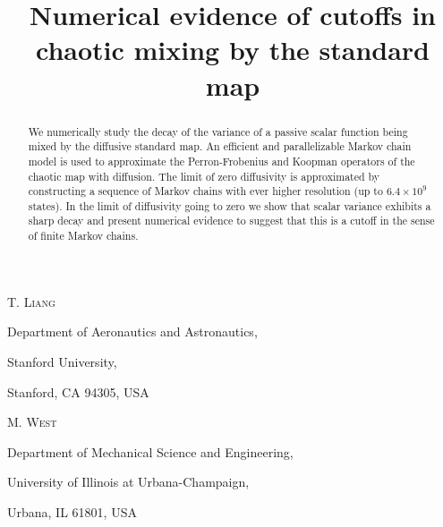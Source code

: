 \documentclass{aims}
\title[Cutoffs in chaotic mixing]
      {Numerical evidence of cutoffs in chaotic mixing by the standard map}
\author[T. Liang and M. West]{}
\theoremstyle{definition}
\begin{document}
\maketitle

\centerline{\scshape T. Liang}
\medskip
{\footnotesize
 \centerline{Department of Aeronautics and Astronautics,}
 \centerline{Stanford University,}
   \centerline{Stanford, CA 94305, USA}
} %

\medskip

\centerline{\scshape M. West}
\medskip
{\footnotesize
 \centerline{Department of Mechanical Science and Engineering,}
 \centerline{University of Illinois at Urbana-Champaign,}
   \centerline{Urbana, IL 61801, USA}
}

\bigskip







\maketitle
\begin{abstract}
  We numerically study the decay of the variance of a passive scalar
  function being mixed by the diffusive standard map. An efficient and
  parallelizable Markov chain model is used to approximate the
  Perron-Frobenius and Koopman operators of the chaotic map with
  diffusion. The limit of zero diffusivity is approximated by
  constructing a sequence of Markov chains with ever higher resolution
  (up to $6.4 \times 10^9$ states). In the limit of diffusivity going
  to zero we show that scalar variance exhibits a sharp decay and
  present numerical evidence to suggest that this is a cutoff in the
  sense of finite Markov chains.
\end{abstract}
\end{document}

